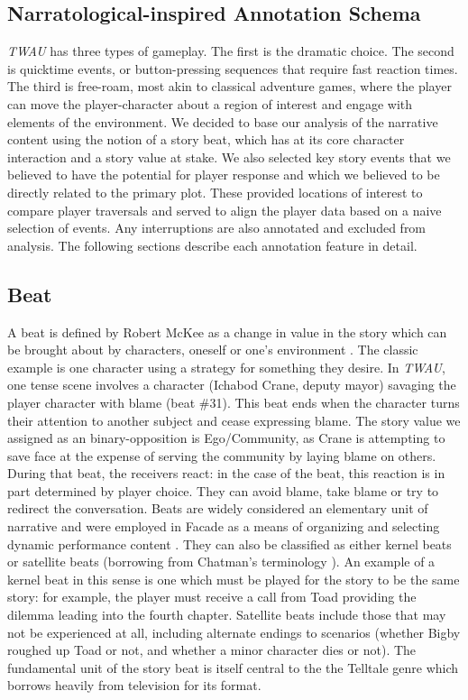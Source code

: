 \subsection{Narratological-inspired Annotation Schema}
\label{sec:org43df907}
\emph{TWAU} has three types of gameplay. The first
is the dramatic choice. The second is quicktime events, or
button-pressing sequences that require fast reaction times. The third
is free-roam, most akin to classical adventure games, where the player
can move the player-character about a region of interest and engage
with elements of the environment. We decided to base our analysis of
the narrative content using the notion of a story beat, which has at
its core character interaction and a story value at stake. We also
selected key story events that we believed to have the potential for
player response and which we believed to be directly related to the
primary plot. These provided locations of interest to compare player
traversals and served to align the player data based on a naive
selection of events. Any interruptions are also annotated and excluded
from analysis. The following sections describe each annotation feature
in detail.
\subsection{Beat}
\label{sec:org40218b7}
A beat is defined by Robert McKee as a change in value in the story
which can be brought about by characters, oneself or one's environment
\cite{Mckee1997-ed}. The classic example is one character using a
strategy for something they desire. In \emph{TWAU}, one tense
scene involves a character (Ichabod Crane, deputy mayor) savaging the
player character with blame (beat \#31). This beat ends when the
character turns their attention to another subject and cease
expressing blame. The story value we assigned as an binary-opposition
is Ego/Community, as Crane is attempting to save face at the expense
of serving the community by laying blame on others. During that beat,
the receivers react: in the case of the beat, this reaction is in part
determined by player choice. They can avoid blame, take blame or try
to redirect the conversation. Beats are widely considered an
elementary unit of narrative and were employed in Facade as a means of
organizing and selecting dynamic performance content
\cite{Mateas2002-in}. They can also be classified as either kernel
beats or satellite beats (borrowing from Chatman's terminology
\cite{Chatman1980-rl}). An example of a kernel beat in this sense is
one which must be played for the story to be the same story: for
example, the player must receive a call from Toad providing the
dilemma leading into the fourth chapter. Satellite beats include those
that may not be experienced at all, including alternate endings to
scenarios (whether Bigby roughed up Toad or not, and whether a minor
character dies or not). The fundamental unit of the story beat is
itself central to the the Telltale genre which borrows heavily from
television for its format.

